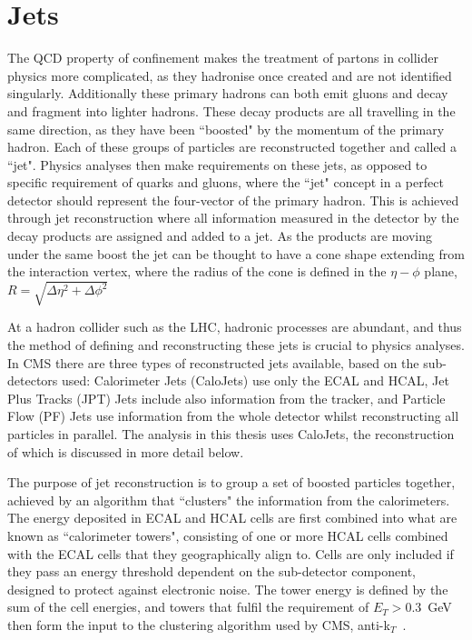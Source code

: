 \section{Jets}
\label{sec:reconjet}
 The QCD property of confinement makes the treatment of partons in collider physics more complicated, as they hadronise once created and are not identified singularly. Additionally these primary hadrons can both emit gluons and decay and fragment into lighter hadrons. These decay products are all travelling in the same direction, as they have been ``boosted" by the momentum of the primary hadron. Each of these groups of particles are reconstructed together and called a ``jet". Physics analyses then make requirements on these jets, as opposed to specific requirement of quarks and gluons, where the ``jet" concept in a perfect detector should represent the four-vector of the primary hadron. This is achieved through jet reconstruction where all information measured in the detector by the decay products are assigned and added to a jet. As the products are moving under the same boost the jet can be thought to have a cone shape extending from the interaction vertex, where the radius of the cone is defined in the $\eta-\phi$ plane, $R= \sqrt{\Delta \eta^{2} + \Delta \phi^{2}}$
 
 At a hadron collider such as the LHC, hadronic processes are abundant, and thus the method of defining and reconstructing these jets is crucial to physics analyses. In CMS there are three types of reconstructed jets available, based on the sub-detectors used: Calorimeter Jets (CaloJets) use only the ECAL and HCAL, Jet Plus Tracks (JPT) Jets include also information from the tracker, and Particle Flow (PF) Jets use information from the whole detector whilst reconstructing all particles in parallel. The analysis in this thesis uses CaloJets, the reconstruction of which is discussed in more detail below. 
 
 The purpose of jet reconstruction is to group a set of boosted particles together, achieved by an algorithm that ``clusters" the information from the calorimeters. The energy deposited in ECAL and HCAL cells are first combined into what are known as ``calorimeter towers", consisting of one or more HCAL cells combined with the ECAL cells that they geographically align to. Cells are only included if they pass an energy threshold dependent on the sub-detector component, designed to protect against electronic noise. The tower energy is defined by the sum of the cell energies, and towers that fulfil the requirement of $E_{T} > 0.3$~GeV then form the input to the clustering algorithm used by CMS, anti-k$_{T}$~\cite{jetroundup}.


